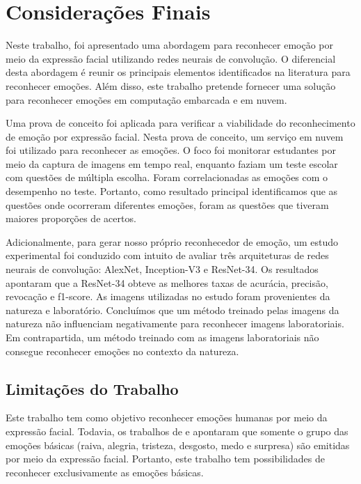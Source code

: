 \chapter{Considerações Finais}\label{sec:conclusao}
Neste trabalho, foi apresentado uma abordagem para reconhecer emoção por meio da expressão facial utilizando redes neurais de convolução. O diferencial desta abordagem é reunir os principais elementos identificados na literatura para reconhecer emoções. Além disso, este trabalho pretende fornecer uma solução para reconhecer emoções em computação embarcada e em nuvem.     

Uma prova de conceito foi aplicada para verificar a viabilidade do reconhecimento de emoção por expressão facial. Nesta prova de conceito, um serviço em nuvem foi utilizado para reconhecer as emoções. O foco foi monitorar estudantes por meio da captura de imagens em tempo real, enquanto faziam um teste escolar com questões de múltipla escolha. Foram correlacionadas as emoções com o desempenho no teste. Portanto, como resultado principal identificamos que as questões onde ocorreram diferentes emoções, foram as questões que tiveram maiores proporções de acertos.  

Adicionalmente, para gerar nosso próprio reconhecedor de emoção, um estudo experimental foi conduzido com intuito de avaliar três arquiteturas de redes neurais de convolução: AlexNet, Inception-V3 e ResNet-34. Os resultados apontaram que a ResNet-34 obteve as melhores taxas de acurácia, precisão, revocação e f1-score. As imagens utilizadas no estudo foram provenientes da natureza e laboratório. Concluímos que um método treinado pelas imagens da natureza não influenciam negativamente para reconhecer imagens laboratoriais. Em contrapartida, um método treinado com as imagens laboratoriais não consegue reconhecer emoções no contexto da natureza.


\section{Limitações do Trabalho}
Este trabalho tem como objetivo reconhecer emoções humanas por meio da expressão facial. Todavia, os trabalhos de \cite{darwin1965expression} e \cite{ekman1994} apontaram que somente o grupo das emoções básicas (raiva, alegria, tristeza, desgosto, medo e surpresa) são emitidas por meio da expressão facial. Portanto, este trabalho tem possibilidades de reconhecer exclusivamente as emoções básicas. 

